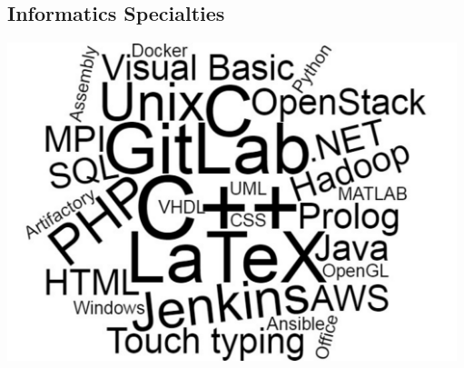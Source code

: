 \documentclass[a4paper]{article}
\begin{document}
\begin{cv}{}
\subsection*{Informatics Specialties}
\begin{center}
  \includegraphics[height=25em]{SkillsCloud}
\end{center}


\end{cv}
\end{document}
